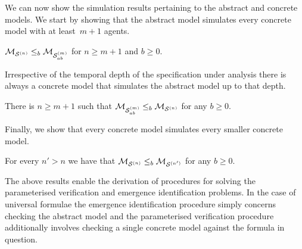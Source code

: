 We can now show the simulation results pertaining to the
abstract and concrete models. We start by showing that the
abstract model simulates every concrete model with at
least~$m+1$ agents. 

\begin{theorem}
\label{th:ab-concr-sim}
$\mathcal{M}_{\mathcal{S}^{(n)}} \leq_b \mathcal{M}_{\mathcal{S}_{ab}^{(m)}}$ for $n \geq m+1$ and $b \geq 0$.
\end{theorem}

Irrespective of the temporal depth of the specification under
analysis there is always a concrete model that simulates the abstract model up
to that depth.

\begin{theorem}
\label{th:concr-ab-sim}
There is $n \geq m+1$ such that $\mathcal{M}_{\mathcal{S}_{ab}^{(m)}} \leq_b \mathcal{M}_{\mathcal{S}^{(n)}}$ for any $b \geq 0$.
\end{theorem}


Finally, we show that every concrete model simulates every smaller concrete model.

\begin{theorem}
\label{th:concr-sim}
For every $n' > n$ we have that $\mathcal{M}_{\mathcal{S}^{(n)}} \leq_b \mathcal{M}_{\mathcal{S}^{(n')}}$ for any
$b \geq 0$.
\end{theorem}

The above results enable the derivation of procedures for solving
the parameterised verification and emergence identification problems. In the case
of universal formulae the emergence identification procedure simply concerns
checking the abstract model and the parameterised verification procedure 
additionally involves checking a single concrete model against the formula in
question.

